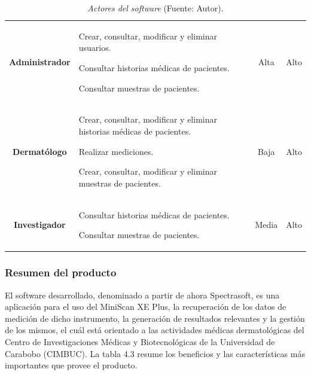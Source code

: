 	\begin{table}[h]
		\small
		\caption[Actores del software]{\textit{Actores del software} (Fuente: Autor).}
		\centering
		\setlength{\extrarowheight}{\altocelda}
		\begin{tabulary}{\anchotabla}{|c|J|c|c|}
			\hline
			 &  &  & \\ \hline
			
			\textbf{Administrador} &
			
			Crear, consultar, modificar y eliminar usuarios.
			
			Consultar historias m\'{e}dicas de pacientes.
			
			Consultar muestras de pacientes. &
			Alta &
			Alto\\ \hline
			
			\textbf{Dermat\'{o}logo} &
			
			Crear, consultar, modificar y eliminar historias m\'{e}dicas de pacientes.
			
			Realizar mediciones.
			
			Crear, consultar, modificar y eliminar muestras de pacientes. &
			Baja &
			Alto\\ \hline
			
			\textbf{Investigador} &
			
			Consultar historias m\'{e}dicas de pacientes.
			
			Consultar muestras de pacientes. &
			Media &
			Alto\\ \hline
		\end{tabulary}
	\end{table}
	
	\subsubsection{Resumen del producto}
	
	El software desarrollado, denominado a partir de ahora Spectrasoft, es una aplicaci\'{o}n para el uso del MiniScan XE Plus, la recuperaci\'{o}n de los datos de medici\'{o}n de dicho instrumento, la generaci\'{o}n de resultados relevantes y la gesti\'{o}n de los mismos, el cu\'{a}l est\'{a} orientado a las actividades m\'{e}dicas dermatol\'{o}gicas del Centro de Investigaciones M\'{e}dicas y Biotecnol\'{o}gicas de la Universidad de Carabobo (CIMBUC). La tabla 4.3 resume los beneficios y las caracter\'{i}sticas m\'{a}s importantes que provee el producto.
	
